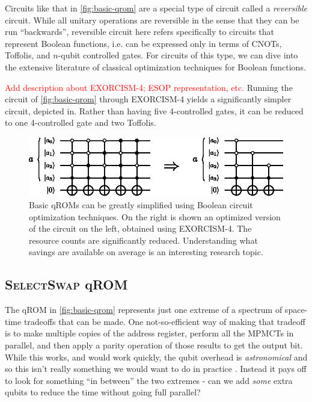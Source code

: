 \documentclass[a4paper,12pt]{article}
\newcommand\todo[1]{\textcolor{red}{#1}}
\begin{document}
Circuits like that in \autoref{fig:basic-qrom} are a special type of circuit called a \emph{reversible} circuit. While all unitary operations are reversible in the sense that they can be run ``backwards'', reversible circuit here refers specifically to circuits that represent Boolean functions, i.e. can be expressed only in terms of CNOTs, Toffolis, and $n$-qubit controlled gates. For circuits of this type, we can dive into the extensive literature of classical optimization techniques for Boolean functions. 

\todo{Add description about EXORCISM-4; ESOP representation, etc.} Running the circuit of \autoref{fig:basic-qrom} through \textsc{EXORCISM-4} yields a significantly simpler circuit, depicted in. Rather than having five 4-controlled gates, it can be reduced to one 4-controlled gate and two Toffolis. 


\begin{figure}
 \centering
 \captionsetup{width=0.89\linewidth}
 \includegraphics[scale=1.6]{images/basic-qrom-exorcised}
 \caption{Basic qROMs can be greatly simplified using Boolean circuit optimization techniques. On the right is shown an optimized version of the circuit on the left, obtained using EXORCISM-4. The resource counts are significantly reduced. Understanding what savings are available on average is an interesting research topic.}
 \label{fig:basic-qrom}
\end{figure}


\subsection{\textsc{SelectSwap}  qROM}

The qROM in \autoref{fig:basic-qrom} represents just one extreme of a spectrum of space-time tradeoffs that can be made. One not-so-efficient way of making that tradeoff is to make multiple copies of the address register, perform all the MPMCTs in parallel, and then apply a parity operation of those results to get the output bit. While this works, and would work quickly, the qubit overhead is \emph{astronomical} and so this isn't really something we would want to do in practice \cite{DiMatteo2020}. Instead it pays off to look for something ``in between'' the two extremes - can we add \emph{some} extra qubits to reduce the time without going full parallel?
\end{document}
